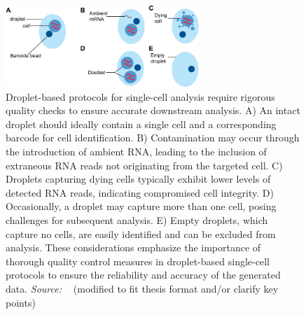 \begin{figure}[!ht]
	\centering
	\includegraphics[width=0.65\textwidth]{QC_cells/fig}
	\vspace{0.1cm}
	\caption[Droplets-based sequencing of dying cells, doublet and empty droplet .]{Droplet-based protocols for single-cell analysis require rigorous quality checks to ensure accurate downstream analysis. A) An intact droplet should ideally contain a single cell and a corresponding barcode for cell identification. B) Contamination may occur through the introduction of ambient RNA, leading to the inclusion of extraneous RNA reads not originating from the targeted cell. C) Droplets capturing dying cells typically exhibit lower levels of detected RNA reads, indicating compromised cell integrity. D) Occasionally, a droplet may capture more than one cell, posing challenges for subsequent analysis. E) Empty droplets, which capture no cells, are easily identified and can be excluded from analysis. These considerations emphasize the importance of thorough quality control measures in droplet-based single-cell protocols to ensure the reliability and accuracy of the generated data. \emph{Source: ~\cite{heumos2023best}} (modified to fit thesis format and/or clarify key points)}
	\label{fig:QCcells}
\end{figure}
